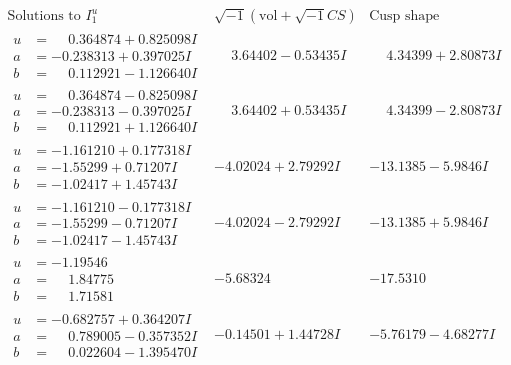 \documentclass[1p]{elsarticle_modified}
\theoremstyle{definition}
\newcommand{\I}{\sqrt{-1}}
\begin{document}
$$\begin{array}{c|c|c}  
\text{Solutions to }I^u_{1}& \I (\text{vol} + \sqrt{-1}CS) & \text{Cusp shape}\\
 \hline 
\begin{aligned}
u &= \phantom{-}0.364874 + 0.825098 I \\
a &= -0.238313 + 0.397025 I \\
b &= \phantom{-}0.112921 - 1.126640 I\end{aligned}
 & \phantom{-}3.64402 - 0.53435 I & \phantom{-}4.34399 + 2.80873 I \\ \hline\begin{aligned}
u &= \phantom{-}0.364874 - 0.825098 I \\
a &= -0.238313 - 0.397025 I \\
b &= \phantom{-}0.112921 + 1.126640 I\end{aligned}
 & \phantom{-}3.64402 + 0.53435 I & \phantom{-}4.34399 - 2.80873 I \\ \hline\begin{aligned}
u &= -1.161210 + 0.177318 I \\
a &= -1.55299 + 0.71207 I \\
b &= -1.02417 + 1.45743 I\end{aligned}
 & -4.02024 + 2.79292 I & -13.1385 - 5.9846 I \\ \hline\begin{aligned}
u &= -1.161210 - 0.177318 I \\
a &= -1.55299 - 0.71207 I \\
b &= -1.02417 - 1.45743 I\end{aligned}
 & -4.02024 - 2.79292 I & -13.1385 + 5.9846 I \\ \hline\begin{aligned}
u &= -1.19546\phantom{ +0.000000I} \\
a &= \phantom{-}1.84775\phantom{ +0.000000I} \\
b &= \phantom{-}1.71581\phantom{ +0.000000I}\end{aligned}
 & -5.68324\phantom{ +0.000000I} & -17.5310\phantom{ +0.000000I} \\ \hline\begin{aligned}
u &= -0.682757 + 0.364207 I \\
a &= \phantom{-}0.789005 - 0.357352 I \\
b &= \phantom{-}0.022604 - 1.395470 I\end{aligned}
 & -0.14501 + 1.44728 I & -5.76179 - 4.68277 I \\ \hline\begin{aligned}

\end{aligned}
\end{array}$$
\end{document}
